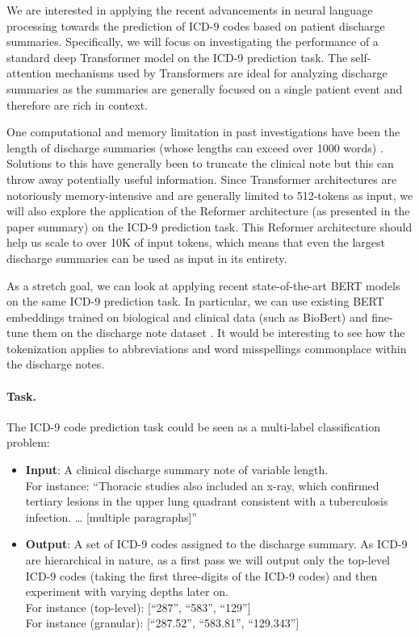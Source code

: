 \documentclass{article}
\begin{document}
We are interested in applying the recent advancements in neural language processing towards the prediction of ICD-9 codes based on patient discharge summaries. Specifically, we will focus on investigating the performance of a standard deep Transformer model on the ICD-9 prediction task. The self-attention mechanisms used by Transformers are ideal for analyzing discharge summaries as the summaries are generally focused on a single patient event and therefore are rich in context. 

One computational and memory limitation in past investigations have been the length of discharge summaries (whose lengths can exceed over 1000 words) \cite{ayyar2016tagging}. Solutions to this have generally been to truncate the clinical note but this can throw away potentially useful information. Since Transformer architectures are notoriously memory-intensive and are generally limited to 512-tokens as input, we will also explore the application of the Reformer architecture (as presented in the paper summary) on the ICD-9 prediction task. This Reformer architecture should help us scale to over 10K of input tokens, which means that even the largest discharge summaries can be used as input in its entirety. 

As a stretch goal, we can look at applying recent state-of-the-art BERT models on the same ICD-9 prediction task. In particular, we can use existing BERT embeddings trained on biological and clinical data (such as BioBert) and fine-tune them on the discharge note dataset \cite{lee2019biobert}. It would be interesting to see how the tokenization applies to abbreviations and word misspellings commonplace within the discharge notes. 


\paragraph{Task.} 
The ICD-9 code prediction task could be seen as a multi-label classification problem:
\begin{itemize}
	\item
		\textbf{Input}: A clinical discharge summary note of variable length.\\
		For instance: “Thoracic studies also included an x-ray, which confirmed tertiary lesions in the upper lung quadrant consistent with a tuberculosis infection. … [multiple paragraphs]”
	\item
		\textbf{Output}: A set of ICD-9 codes assigned to the discharge summary. As ICD-9 are hierarchical in nature, as a first pass we will output only the top-level ICD-9 codes (taking the first three-digits of the ICD-9 codes) and then experiment with varying depths later on. \\
		For instance (top-level): [“287”, “583”, “129”]\\
		For instance (granular): [“287.52”, “583.81”, “129.343”]
\end{itemize}
\end{document}
